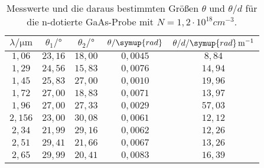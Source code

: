 \begin{table}[hbt!]
  \centering
  \caption{Messwerte und die daraus bestimmten Größen $\theta$ und $\theta/d$ für die n-dotierte GaAs-Probe
  mit $N=1,2 \cdot 10^{18} \si{cm}^{-3}$.}
  \label{tab:m2}
  \begin{tabular}{c c c c c}
    \toprule
    $\lambda/\si{\micro\meter}$ & $\theta_{1}/\si{\degree}$ & $\theta_{2}/\si{\degree}$ & $\theta/\symup{rad}$ & $\theta/d/\symup{rad}\, \si{m}^{-1}$\\
    \midrule
    $1,06 $ & $23,16$ & $18,00$ & $0,0045$ & $ 8,84$ \\
    $1,29 $ & $24,56$ & $15,83$ & $0,0076$ & $14,94$ \\
    $1,45 $ & $25,83$ & $27,00$ & $0,0010$ & $19,96$ \\
    $1,72 $ & $27,00$ & $18,83$ & $0,0071$ & $13,97$ \\
    $1,96 $ & $27,00$ & $27,33$ & $0,0029$ & $57,03$ \\
    $2,156$ & $23,00$ & $30,08$ & $0,0061$ & $12,12$ \\
    $2,34 $ & $21,99$ & $29,16$ & $0,0062$ & $12,26$ \\
    $2,51 $ & $29,41$ & $21,66$ & $0,0067$ & $13,26$ \\
    $2,65 $ & $29,99$ & $20,41$ & $0,0083$ & $16,39$ \\
    \bottomrule
  \end{tabular}
\end{table}

